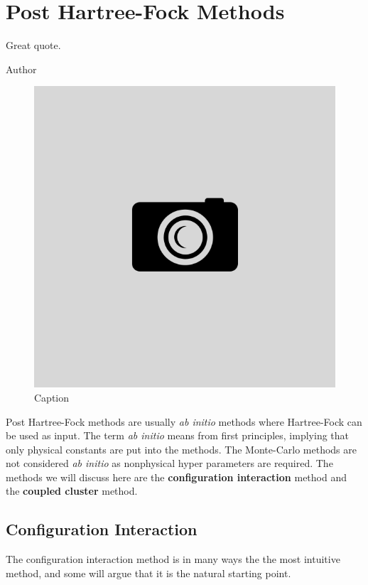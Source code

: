 \chapter{Post Hartree-Fock Methods}\label{chp:posthartreefock}
\epigraph{Great quote.}{Author}
\begin{figure}[H]
	\centering
	\includegraphics[scale=0.4]{Images/example.png}
	\caption{Caption}
\end{figure}

Post Hartree-Fock methods are usually \textit{ab initio} methods where Hartree-Fock can be used as input. The term \textit{ab initio} means from first principles, implying that only physical constants are put into the methods. The Monte-Carlo methods are not considered \textit{ab initio} as nonphysical hyper parameters are required. The methods we will discuss here are the \textbf{configuration interaction} method and the \textbf{coupled cluster} method. \newpage

\section{Configuration Interaction} \label{sec:ci}
The configuration interaction method is in many ways the the most intuitive method, and some will argue that it is the natural starting point. 

